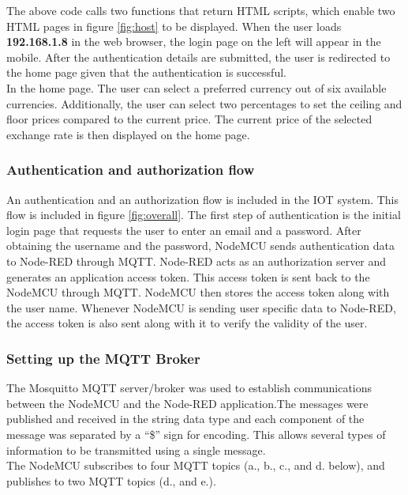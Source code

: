 The above code calls two functions that return HTML scripts, which enable two HTML pages in figure \ref{fig:host} to be displayed. When the user loads \textbf{192.168.1.8} in the web browser, the login page on the left will appear in the mobile. After the authentication details are submitted, the user is redirected to the home page given that the authentication is successful.\\

In the home page. The user can select a preferred currency out of six available currencies. Additionally, the user can select two percentages to set the ceiling and floor prices compared to the current price. The current price of the selected exchange rate is then displayed on the home page.

\subsubsection{Authentication and authorization flow}

An authentication and an authorization flow is included in the IOT system. This flow is included in figure \ref{fig:overall}. The first step of authentication is the initial login page that requests the user to enter an email and a password. After obtaining the username and the password, NodeMCU sends authentication data to Node-RED through MQTT. Node-RED acts as an authorization server and generates an application access token. This access token is sent back to the NodeMCU through MQTT. NodeMCU then stores the access token along with the user name. Whenever NodeMCU is sending user specific data to Node-RED, the access token is also sent along with it to verify the validity of the user.

\subsubsection{Setting up the MQTT Broker}

The Mosquitto MQTT \cite{mosq} server/broker was used to establish communications between the NodeMCU and the Node-RED application.The messages were published and received in the string data type and each component of the message was separated by a “\$” sign for encoding. This allows several types of information to be transmitted using a single message.\\

The NodeMCU subscribes to four MQTT topics (a., b., c., and d. below), and publishes to two MQTT topics (d., and e.).\\


